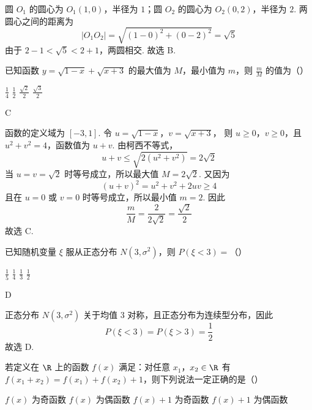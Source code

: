\begin{solution}
圆 \(O_{1}\) 的圆心为 \(O_{1}(1,0)\)，半径为 \(1\)；圆 \(O_{2}\) 的圆心为 \(O_{2}(0,2)\)，半径为 \(2\). 两圆心之间的距离为
\[
|O_{1}O_{2}|=\sqrt{(1-0)^{2}+(0-2)^{2}}=\sqrt{5}
\]
由于 \(2-1<\sqrt{5}<2+1\)，两圆相交. 故选 B.
\end{solution}

\begin{problem}
已知函数 \( y = \sqrt{1 - x} + \sqrt{x + 3} \) 的最大值为 \(M\)，最小值为 \( m \)，则 \( \frac{m}{M} \) 的值为（\quad）

\choices
    {\( \frac{1}{4} \)}
    {\( \frac{1}{2} \)}
    {\( \frac{\sqrt{2}}{2} \)}
    {\( \frac{\sqrt{3}}{2} \)}
\end{problem}

\begin{answer}
C
\end{answer}

\begin{solution}
函数的定义域为 \([-3,1]\). 令
\(u=\sqrt{1-x}\)，\(v=\sqrt{x+3}\)，
则 \(u\geqslant0\)，\(v\geqslant0\)，且 \(u^{2}+v^{2}=4\)，函数值为 \(u+v\). 由柯西不等式，
\[
u+v\leqslant\sqrt{2(u^{2}+v^{2})}=2\sqrt{2}
\]
当 \(u=v=\sqrt{2}\) 时等号成立，所以最大值 \(M=2\sqrt{2}\). 又因为
\[
(u+v)^{2}=u^{2}+v^{2}+2uv\geqslant4
\]
且在 \(u=0\) 或 \(v=0\) 时等号成立，所以最小值 \(m=2\). 因此
\[
\frac{m}{M}=\frac{2}{2\sqrt{2}}=\frac{\sqrt{2}}{2}
\]
故选 C.
\end{solution}

\begin{problem}
已知随机变量 \(\xi\) 服从正态分布 \(N(3, \sigma^2)\)，则 \(P(\xi < 3) =\)（\quad）

\choices
    {\(\frac{1}{5}\)}
    {\( \frac{1}{4} \)}
    {\( \frac{1}{3} \)}
    {\(\frac{1}{2}\)}
\end{problem}

\begin{answer}
D
\end{answer}

\begin{solution}
正态分布 \(N(3,\sigma^{2})\) 关于均值 \(3\) 对称，且正态分布为连续型分布，因此
\[
P(\xi<3)=P(\xi>3)=\frac{1}{2}
\]
故选 D.
\end{solution}

\begin{problem}
若定义在 \(\R\) 上的函数 \(f(x)\) 满足：对任意 \(x_{1}\)，\(x_{2} \in \R\) 有 \(f(x_{1} + x_{2}) = f(x_{1}) + f(x_{2}) + 1\)，则下列说法一定正确的是（\quad）

\choices
    {\(f(x)\) 为奇函数}
    {\(f(x)\) 为偶函数}
    {\(f(x) + 1\) 为奇函数}
    {\(f(x) + 1\) 为偶函数}
\end{problem}

